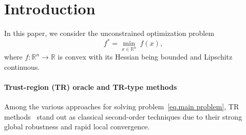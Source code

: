 \documentclass{article}
\begin{document}
\begin{abstract}
    Trust-region-type oracles are well known for their robust global behavior and rapid local convergence. This paper introduces the first accelerated variants of trust-region methods for convex optimization. We propose two algorithms: the first achieves an oracle complexity of $\tilde O(\epsilon^{-1/3})$ and enjoys quadratic convergence in a local neighborhood of the optimum; the second further improves global performance, achieving a near-optimal oracle complexity of $\tilde O(\epsilon^{-2/7})$. Together, these methods enhance the global efficiency of trust-region-type algorithms while preserving strong local behavior where possible. Numerical experiments verify the global advantage of our methods, which are comparable to existing accelerated second-order algorithms and consistently outperform non-accelerated ones. Moreover, the first variant’s quadratic local convergence confirms its practical strength in high-accuracy regimes.
\end{abstract}
\section{Introduction}
\label{Intro}
In this paper, we consider the unconstrained optimization problem \begin{equation} \label{eq.main problem} f^* = \min_{x\in \mathbb{R}^n}~ f(x), \end{equation} where $f:\mathbb{R}^n\to \mathbb{R}$ is convex with its Hessian being bounded and Lipschitz continuous. 

\paragraph{Trust-region (TR) oracle and TR-type methods}

Among the various approaches for solving problem~\eqref{eq.main problem}, TR methods~\cite{More1983,conn2000trust,yuan2015recent} stand out as classical second-order techniques due to their strong global robustness and rapid local convergence.
\end{document}
